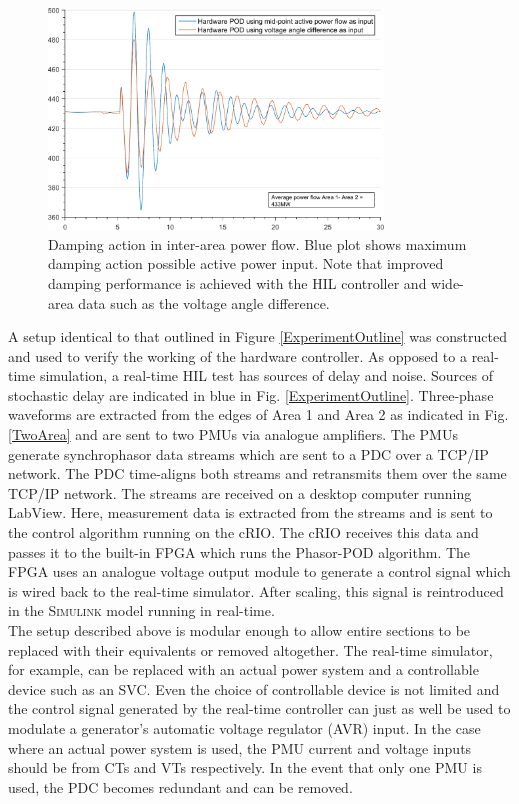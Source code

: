 \documentclass[conference]{IEEEtran}
\begin{document}
\begin{figure}[htb]
	\includegraphics[width=3.5in]{SVC_ResponseComparison_Labelled.pdf} 
	\caption{Damping action in inter-area power flow. Blue plot shows maximum damping action possible active power input. Note that improved damping performance is achieved with the HIL controller and wide-area data such as the voltage angle difference.}
	\label{HILGraph}
\end{figure}

A setup identical to that outlined in Figure \ref{ExperimentOutline} was constructed and used to verify the working of the hardware controller. As opposed to a real-time simulation, a real-time HIL test has sources of delay and noise. Sources of stochastic delay are indicated in blue in Fig. \ref{ExperimentOutline}. Three-phase waveforms are extracted from the edges of Area 1 and Area 2 as indicated in Fig. \ref{TwoArea} and are sent to two PMUs via analogue amplifiers. The PMUs generate synchrophasor data streams which are sent to a PDC over a TCP/IP network. The PDC time-aligns both streams and retransmits them over the same TCP/IP network. The streams are received on a desktop computer running LabView. Here, measurement data is extracted from the streams and is sent to the control algorithm running on the cRIO. The cRIO receives this data and passes it to the built-in FPGA which runs the Phasor-POD algorithm. The FPGA uses an analogue voltage output module to generate a control signal which is wired back to the real-time simulator. After scaling, this signal is reintroduced in the \textsc{Simulink} model running in real-time.\\

The setup described above is modular enough to allow entire sections to be replaced with their equivalents or removed altogether. The real-time simulator, for example, can be replaced with an actual power system and a controllable device such as an SVC. Even the choice of controllable device is not limited and the control signal generated by the real-time controller can just as well be used to modulate a generator's automatic voltage regulator (AVR) input. In the case where an actual power system is used, the PMU current and voltage inputs should be from CTs and VTs respectively. In the event that only one PMU is used, the PDC becomes redundant and can be removed.\\
\end{document}
